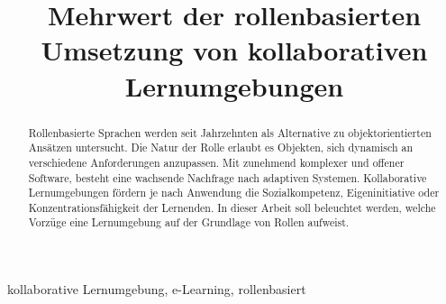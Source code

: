 \documentclass[conference]{IEEEtran}
\begin{document}
\title{Mehrwert der rollenbasierten Umsetzung von kollaborativen Lernumgebungen\\}


\author{
}



\maketitle

\begin{abstract} Rollenbasierte Sprachen werden seit Jahrzehnten als Alternative zu objektorientierten Ansätzen untersucht. Die Natur der Rolle erlaubt es Objekten, sich dynamisch an verschiedene Anforderungen anzupassen. Mit zunehmend komplexer und offener Software, besteht eine wachsende Nachfrage nach adaptiven Systemen. Kollaborative Lernumgebungen fördern je nach Anwendung die Sozialkompetenz, Eigeninitiative oder Konzentrationsfähigkeit der Lernenden. In dieser Arbeit soll beleuchtet werden, welche Vorzüge eine Lernumgebung auf der Grundlage von Rollen aufweist.
\end{abstract}

\begin{IEEEkeywords}
kollaborative Lernumgebung, e-Learning, rollenbasiert
\end{IEEEkeywords}
\end{document}
